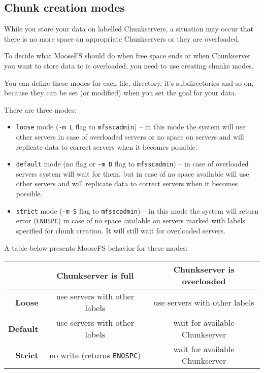\documentclass[a4paper,11pt,english]{report}
\def\code#1{\texttt{#1}}
\begin{document}
			\subsection{Chunk creation modes}
			While you store your data on labelled Chunkservers, a situation may occur that there is no more space on appropriate Chunkservers or they are overloaded.
			
			To decide what MooseFS should do when free space ends or when Chunkserver you want to store data to is overloaded, you need to use creating chunks modes.
			
			You can define these modes for each file, directory, it's subdirectories and so on, because they can be set (or modified) when you set the goal for your data.
			
			There are three modes:
			
			\begin{itemize}
				\item \code{loose} mode (\code{-m L} flag to \code{mfsscadmin}) -- in this mode the system will use other servers in case of overloaded servers or no space on servers and will replicate data to correct servers when it becomes possible.
				\item \code{default} mode (no flag or \code{-m D} flag to \code{mfsscadmin}) -- in case of overloaded servers system will wait for them, but in case of no space available will use other servers and will replicate data to correct servers when it becomes possible.
				\item \code{strict} mode (\code{-m S} flag to \code{mfsscadmin}) -- in this mode the system will return error (\code{ENOSPC}) in case of no space available on servers marked with labels specified for chunk creation. It will still wait for overloaded servers.
			\end{itemize}
			
			\bigskip
			A table below presents MooseFS behavior for these modes:
			\bigskip
			
			\begin{tabular}{r|c|c}
									& \textbf{Chunkserver is full}		& \textbf{Chunkserver is overloaded} \\
				\hline
				\textbf{Loose}		& use servers with other labels		& use servers with other labels \\
				\hline
				\textbf{Default}		& use servers with other labels 		& wait for available Chunkserver \\
				\hline
				\textbf{Strict}		& no write (returns \code{ENOSPC})	& wait for available Chunkserver \\
			\end{tabular}
			\bigskip
			
\end{document}
